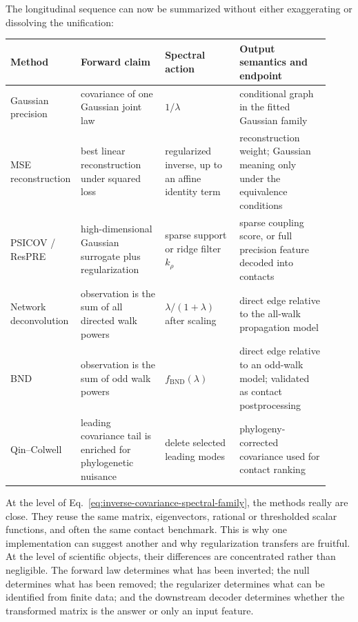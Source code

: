 The longitudinal sequence can now be summarized without either exaggerating or dissolving the
unification:
\begin{center}
\scriptsize
\begin{tabular}{@{}>{\raggedright\arraybackslash}p{0.14\linewidth}
                >{\raggedright\arraybackslash}p{0.26\linewidth}
                >{\raggedright\arraybackslash}p{0.23\linewidth}
                >{\raggedright\arraybackslash}p{0.29\linewidth}@{}}
\toprule
Method & Forward claim & Spectral action & Output semantics and endpoint \\
\midrule
Gaussian precision & covariance of one Gaussian joint law & $1/\lambda$ & conditional graph in the fitted Gaussian family \\
MSE reconstruction & best linear reconstruction under squared loss & regularized inverse, up to an affine identity term & reconstruction weight; Gaussian meaning only under the equivalence conditions \\
PSICOV / ResPRE & high-dimensional Gaussian surrogate plus regularization & sparse support or ridge filter $k_\rho$ & sparse coupling score, or full precision feature decoded into contacts \\
Network deconvolution & observation is the sum of all directed walk powers & $\lambda/(1+\lambda)$ after scaling & direct edge relative to the all-walk propagation model \\
BND & observation is the sum of odd walk powers & $f_{\mathrm{BND}}(\lambda)$ & direct edge relative to an odd-walk model; validated as contact postprocessing \\
Qin--Colwell & leading covariance tail is enriched for phylogenetic nuisance & delete selected leading modes & phylogeny-corrected covariance used for contact ranking \\
\bottomrule
\end{tabular}
\end{center}

At the level of Eq.~\ref{eq:inverse-covariance-spectral-family}, the methods really are close.
They reuse the same matrix, eigenvectors, rational or thresholded scalar functions, and often the
same contact benchmark.  This is why one implementation can suggest another and why
regularization transfers are fruitful.  At the level of scientific objects, their differences are
concentrated rather than negligible.  The forward law determines what has been inverted; the null
determines what has been removed; the regularizer determines what can be identified from finite
data; and the downstream decoder determines whether the transformed matrix is the answer or only
an input feature.


